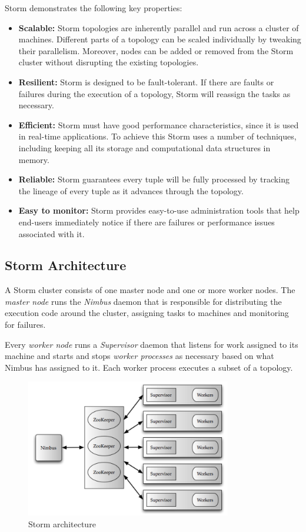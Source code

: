 Storm demonstrates the following key properties:
\begin{itemize}
\item \textbf{Scalable:} Storm topologies are inherently parallel and run across a cluster of machines. Different parts of a topology can be scaled individually by tweaking their parallelism. Moreover, nodes can be added or removed from the Storm cluster without disrupting the existing topologies.
\item \textbf{Resilient:} Storm is designed to be fault-tolerant. If there are faults or failures during the execution of a topology, Storm will reassign the tasks as necessary.
\item \textbf{Efficient:} Storm must have good performance characteristics, since it is used in real-time applications. To achieve this Storm uses a number of techniques, including keeping all its storage and computational data structures in memory.
\item \textbf{Reliable:} Storm guarantees every tuple will be fully processed by tracking the lineage of every tuple as it advances through the topology.
\item \textbf{Easy to monitor:} Storm provides easy-to-use administration tools that help end-users immediately notice if there are failures or performance issues associated with it.
\end{itemize}

\subsection{Storm Architecture}

A Storm cluster consists of one master node and one or more worker nodes. The \emph{master node} runs the \emph{Nimbus} daemon that is responsible for distributing the execution code around the cluster, assigning tasks to machines and monitoring for failures.

Every \emph{worker node} runs a \emph{Supervisor} daemon that listens for work assigned to its machine and starts and stops \emph{worker processes} as necessary based on what Nimbus has assigned to it. Each worker process executes a subset of a topology.

\begin{figure}[H]
\centering
\includegraphics[width=0.8\textwidth]{figures/storm_cluster}
\caption{Storm architecture}
\label{figure:storm_cluster}
\end{figure}

